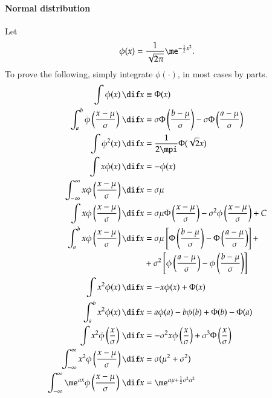 \documentclass[a4paper]{article}
\numberwithin{equation}{subsection}
\begin{document}
\paragraph{Normal distribution}
Let
\begin{equation}
  \phi(x)
  =
  \frac{1}{\sqrt{2\pi}}
  \me^{-\frac{1}{2} x^{2}}.
\end{equation}
To prove the following, simply integrate $\phi(\cdot)$, in most cases
by parts.
\begin{align}
  \int \phi(x) \,\dif x
  &\equiv
  \Phi(x)
  \\
  \int_{a}^{b} \phi\left(\frac{x - \mu}{\sigma} \right) \,\dif x
  &=
  \sigma \Phi \left(\frac{b - \mu}{\sigma} \right) -
  \sigma \Phi \left(\frac{a - \mu}{\sigma} \right)
  \\
  \int \phi^2(x) \,\dif x
  &=
  \frac{1}{2\mpi} \Phi(\sqrt{2} x)
  \\
  \int x \phi(x) \,\dif x
  &=
  -\phi(x)
  \\
  \int_{-\infty}^\infty x \phi \left( \frac{x-\mu}{\sigma} \right) 
  \dif x 
  &=
  \sigma \mu \\
  \int  x \phi \left( \frac{x-\mu}{\sigma} \right) \dif x 
  &=
  \sigma \mu
  \Phi \left( \frac{x-\mu}{\sigma} \right) 
  -
  \sigma^2
  \phi \left( \frac{x-\mu}{\sigma} \right) 
  + C
  \\
  \int_a^b  x \phi \left( \frac{x-\mu}{\sigma} \right) \dif x 
  &=
  \sigma \mu \left[
    \Phi \left( \frac{b-\mu}{\sigma} \right) -
    \Phi \left( \frac{a-\mu}{\sigma} \right) \right] + \notag\\
  &+
  \sigma^2 \left[
    \phi \left( \frac{a-\mu}{\sigma} \right) -
    \phi \left( \frac{b-\mu}{\sigma} \right) \right]\\
  \int x^2 \phi (x) \, \dif x 
  &= 
  -x \phi (x) + \Phi(x)\\
  \int_a^b x^2 \phi(x) \,\dif x
  &=
  a\phi(a) - b\phi(b) + \Phi(b) - \Phi(a)\\
  \int x^2 \phi \left( \frac{x}{\sigma} \right) \, \dif x 
  &= 
  -\sigma^2 x \phi \left( \frac{x}{\sigma} \right) +
  \sigma^3 \Phi \left( \frac{x}{\sigma} \right)\\
  \int_{-\infty}^\infty x^2 \phi \left( \frac{x-\mu}{\sigma} \right)
  \dif x 
  &= 
  \sigma ( \mu^2 + \sigma^2) \\
  \int_{-\infty}^\infty \me^{\alpha x} 
  \phi \left( \frac{x-\mu}{\sigma} \right) \,\dif x 
  &= 
  \me^{\alpha \mu + \frac{1}{2} \sigma^2 \alpha^2} \\

\end{align}
\end{document}
